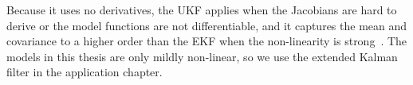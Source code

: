 Because it uses no derivatives, the UKF applies when the Jacobians are hard to derive or the model functions are not differentiable, and it captures the mean and covariance to a higher order than the EKF when the non-linearity is strong~\cite[Ch.~5]{sarkka:bayesian_filtering}. The models in this thesis are only mildly non-linear, so we use the extended Kalman filter in the application chapter.


